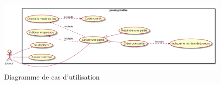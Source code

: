 \begin{figure}[h]%
	\includegraphics[width=\columnwidth]{images/UML_casUtilisation_Complet.png}%
	\caption{Diagramme de cas d'utilisation}%
	\label{fig:useCase}%
\end{figure}



